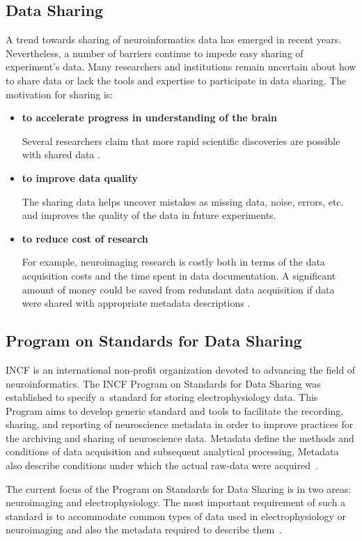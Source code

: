 \documentclass[conference]{IEEEtran}
\begin{document}
\subsection{Data Sharing}
A trend towards sharing of neuroinformatics data has emerged in recent years. Nevertheless, a number of barriers continue to impede easy sharing of experiment's data. Many researchers and institutions remain uncertain about how to share data or lack the tools and expertise to participate in data sharing. The motivation for sharing is:
\begin{itemize}
	\item \textbf{to accelerate progress in understanding of the brain}
	
	
	Several researchers claim that more rapid scientific discoveries are possible with shared data \cite{Milham2012} \cite{Poldrack2012}.
	\item \textbf{to improve data quality}
	
	The sharing data helps uncover mistakes as missing data, noise, errors, etc. and improves the quality of the data in future experiments.
	\item  \textbf{to reduce cost of research}
	
	For example, neuroimaging research is costly both in terms of the data acquisition costs and the time spent in data documentation. A significant amount of money could be saved from redundant data acquisition if data were shared with appropriate metadata descriptions \cite{Poline2012}.
	\end{itemize}


\subsection{Program on Standards for Data Sharing}
\label{incf}
INCF is an international non-profit organization devoted to advancing the field of neuroinformatics. The INCF Program on Standards for Data Sharing was established to specify a~standard for storing electrophysiology data.  This Program aims to develop generic standard and tools to facilitate the recording, sharing, and reporting of neuroscience metadata in order to improve practices for the archiving and sharing of neuroscience data. Metadata define the methods and conditions of data acquisition and subsequent analytical processing, Metadata also describe conditions under which the actual raw-data were acquired~\cite{incf_mission}.

The current focus of the Program on Standards for Data Sharing is in two areas: neuroimaging and electrophysiology. The most important requirement of such a standard is to accommodate common types of data used in electrophysiology or neuroimaging and also the metadata required to describe them~\cite{incf_mission}.
\end{document}
